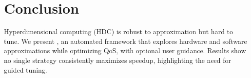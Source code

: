 \section{Conclusion}
Hyperdimensional computing (HDC) is robust to approximation but hard to tune. We present \pname{}, an automated framework that explores hardware and software approximations while optimizing QoS, with optional user guidance. Results show no single strategy consistently maximizes speedup, highlighting the need for guided tuning.
